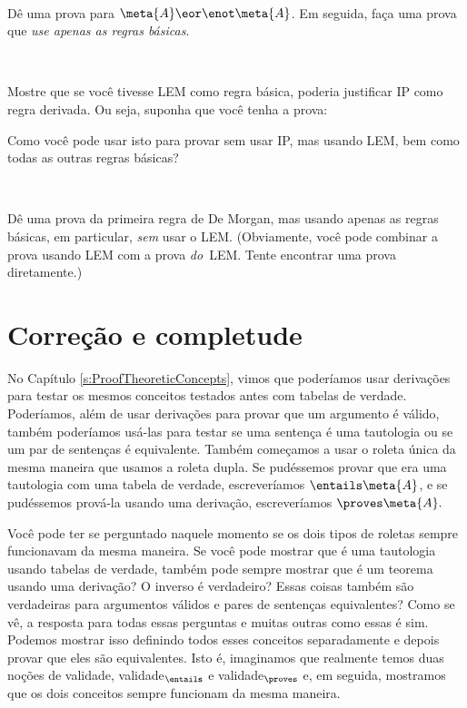 \

\problempart
Dê uma prova para $\meta{A} \eor \enot\meta{A}$. Em seguida, faça uma prova que \emph{use apenas as regras básicas}.

\

\problempart
Mostre que se você tivesse LEM como regra básica, poderia justificar IP como regra derivada. Ou seja, suponha que você tenha a prova:
\begin{fitchproof}
  \open
  \close
\end{fitchproof}
Como você pode usar isto para provar  sem usar IP, mas usando
LEM, bem como todas as outras regras básicas?

\

\problempart
Dê uma prova da primeira regra de De Morgan, mas usando apenas as regras básicas, em particular,  \emph{sem} usar o LEM. (Obviamente, você pode combinar a prova usando LEM com a prova  \emph{do}~LEM. Tente encontrar uma prova diretamente.)


\chapter{Correção e completude}
\label{sec:soundness_and_completeness}

No Capítulo \ref{s:ProofTheoreticConcepts}, vimos que poderíamos usar derivações para testar os mesmos conceitos testados antes com tabelas de verdade. Poderíamos, além de usar derivações para provar que um argumento é válido, também poderíamos usá-las para testar se uma sentença é uma tautologia ou se um par de sentenças é equivalente. Também começamos a usar o roleta única da mesma maneira que usamos a roleta  dupla.  Se pudéssemos provar que  era uma tautologia com uma tabela de verdade,  escreveríamos  $\entails \meta{A}$, e se pudéssemos prová-la usando uma derivação, escreveríamos $\proves \meta{A}.$ 

Você pode ter se perguntado naquele momento se os dois tipos de roletas sempre funcionavam da mesma maneira. Se você pode mostrar que  é uma tautologia usando tabelas de verdade, também pode sempre mostrar que é um teorema usando uma derivação? O inverso é verdadeiro? Essas coisas também são verdadeiras para argumentos válidos e pares de sentenças equivalentes? Como se vê, a resposta para todas essas perguntas e muitas outras como essas é sim. Podemos mostrar isso definindo todos esses conceitos separadamente e depois provar que eles são equivalentes.  Isto é, imaginamos que realmente temos duas noções de validade, validade$_{\entails}$ e validade$_{\proves}$ e, em seguida, mostramos que os dois conceitos sempre funcionam da mesma maneira.



